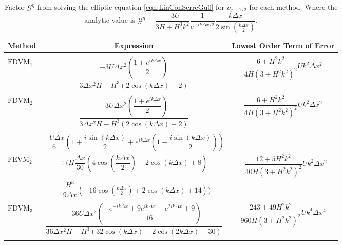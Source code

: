 \begin{landscape}
	\begin{table}
		\begin{tabular}{l  c  c}
			Method& Expression& Lowest Order Term of Error \T \B\\
			\hline  \\
			$\text{FDVM}_1$& $\dfrac{-3 U\Delta x^2 \left(\dfrac{1 + e^{ik\Delta x}}{2}\right)}{3 \Delta x^2 H - H^3 \left(2\cos\left(k\Delta x\right) - 2\right)}$ & $\dfrac{6 +H^2k^2}{4H \left(3 + H^2k^2\right)^2}Uk^2 \Delta x^2$  \\ \\
			$\text{FDVM}_2$& $\dfrac{-3U \Delta x^2 \left(\dfrac{1 + e^{ik\Delta x}}{2}\right)}{3 \Delta x^2 H - H^3 \left(2\cos\left(k\Delta x\right) - 2\right)}$ & $\dfrac{6 +H^2k^2}{4H \left(3 + H^2k^2\right)^2}Uk^2 \Delta x^2$  \\ \\
			& $\dfrac{-U\Delta x}{6} \left(1 + \dfrac{i \sin\left(k \Delta x\right)}{2} + e^{ik\Delta x}\left(1 - \dfrac{i \sin\left(k \Delta x\right)}{2}\right) \right)$ & \\  $\text{FEVM}_2$ & $\div  \Bigg( H\dfrac{\Delta x}{30} \left(4\cos\left(\dfrac{k \Delta x}{2}\right) - 2\cos\left({k \Delta x}\right) + 8\right) $  & $-\dfrac{12 + 5H^2k^2}{40H \left(3 + H^2k^2\right)^2}Uk^2 \Delta x^2$ \\ &$+ \dfrac{H^3 }{9\Delta x}\left(-16\cos\left(\frac{k\Delta x}{2}\right) + 2 \cos\left(k \Delta x\right) + 14\right)    \Bigg)$ & \\ \\
			$\text{FDVM}_3$&  $\dfrac{-36U \Delta x^2 \left(\dfrac{-e^{-ik\Delta x} + 9e^{ik\Delta x} - e^{2ik\Delta x} + 9}{16}\right)}{36 \Delta x^2H - H^3\left(32\cos\left(k \Delta x\right) -2\cos\left(2k \Delta x\right) - 30\right)}$ & $\dfrac{243 + 49H^2k^2}{960H\left(3 + H^2k^2\right)^2}Uk^4 \Delta x^4$  \\ \\ 
			\hline
		\end{tabular}
		\caption{Factor $\mathcal{G}^\eta$ from solving the elliptic equation \eqref{eqn:LinConSerreGu0} for $\upsilon_{j+1/2}$ for each method. Where the analytic value is  $\mathcal{G}^\eta = \dfrac{-3U }{3H + H^3k^2} \dfrac{1}{e^{-ik\Delta x/2}} \dfrac{k\Delta x}{2 \sin\left(\frac{k \Delta x}{2}\right)}$.}
		\label{tab:Gnfactor} 
	\end{table}
\begin{table}
	\begin{tabular}{l  c  c}

\end{tabular}
\end{table}
\end{landscape}
